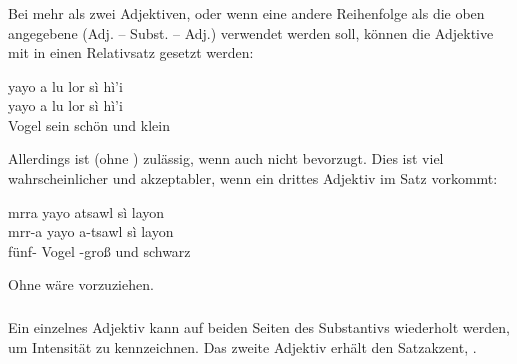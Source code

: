 \subsubsection{} Bei mehr als zwei Adjektiven, oder wenn eine andere Reihenfolge als die oben angegebene (Adj. -- Subst. -- Adj.) verwendet werden soll, können die Adjektive mit  in einen Relativsatz gesetzt werden:

\begin{interlin}
	\glll yayo a lu lor sì hì'i \\
	yayo a lu lor sì hì'i \\
	Vogel  sein schön und klein \\
	 \Ipawl{}
\end{interlin}

\noindent Allerdings ist  (ohne ) zulässig, wenn auch nicht bevorzugt. Dies ist viel wahrscheinlicher und akzeptabler, wenn ein drittes Adjektiv im Satz vorkommt:

\begin{interlin}
	\glll mrra yayo atsawl sì layon \\
	mrr-a yayo a-tsawl sì layon \\
	fünf- Vogel -groß und schwarz \\
	 \Ipawl{}
\end{interlin}

\noindent Ohne  wäre  vorzuziehen.

\subsubsection{} Ein einzelnes Adjektiv kann auf beiden Seiten des Substantivs wiederholt werden, um Intensität zu kennzeichnen. Das zweite Adjektiv erhält den Satzakzent,  .

